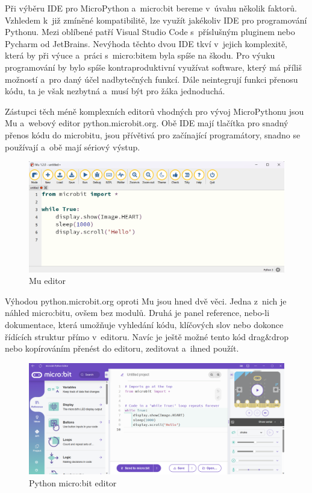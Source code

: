 \documentclass[
  digital,     %
  oneside,     %
  nosansbold,  %
  colorbold, %
  lof,         %
  nolot,         %
]{fithesis4}
\begin{document}
Při výběru IDE pro MicroPython a~micro:bit bereme v~úvahu několik faktorů. 
Vzhledem k~již zmíněné kompatibilitě, lze využít jakékoliv IDE pro programování Pythonu. Mezi oblíbené patří Visual Studio Code s~příslušným pluginem nebo Pycharm od JetBrains. Nevýhoda těchto dvou IDE tkví v~jejich komplexitě, která by při výuce a~práci s~micro:bitem byla spíše na škodu. Pro výuku programování by bylo spíše kontraproduktivní využívat software, který má příliš možností a~pro daný účel nadbytečných funkcí. Dále neintegrují funkci přenosu kódu, ta je však nezbytná a~musí být pro žáka jednoduchá.

Zástupci těch méně komplexních editorů vhodných pro vývoj MicroPythonu jsou Mu a~webový editor python.microbit.org. Obě IDE mají tlačítka pro snadný přenos kódu do microbitu, jsou přívětivá pro začínající programátory, snadno se používají a~obě mají sériový výstup. 

\begin{figure}[ht]
    \centering
    \includegraphics[width=\textwidth]  {images/mu.png}
    \caption{Mu editor}
    \label{MuED}
\end{figure}

Výhodou python.microbit.org oproti Mu jsou hned dvě věci. Jedna z~nich je náhled micro:bitu, ovšem bez modulů. Druhá je panel reference, nebo-li dokumentace, která umožňuje vyhledání kódu, klíčových slov nebo dokonce řídících struktur přímo v~editoru. Navíc je ještě možné tento kód drag\&drop nebo kopírováním přenést do editoru, zeditovat a~ihned použít. 

\begin{figure}[ht]
    \centering
    \includegraphics[width=\textwidth]  {images/pythonMBE.png}
    \caption{Python micro:bit editor}
    \label{MicroBitED}
\end{figure}
\end{document}

